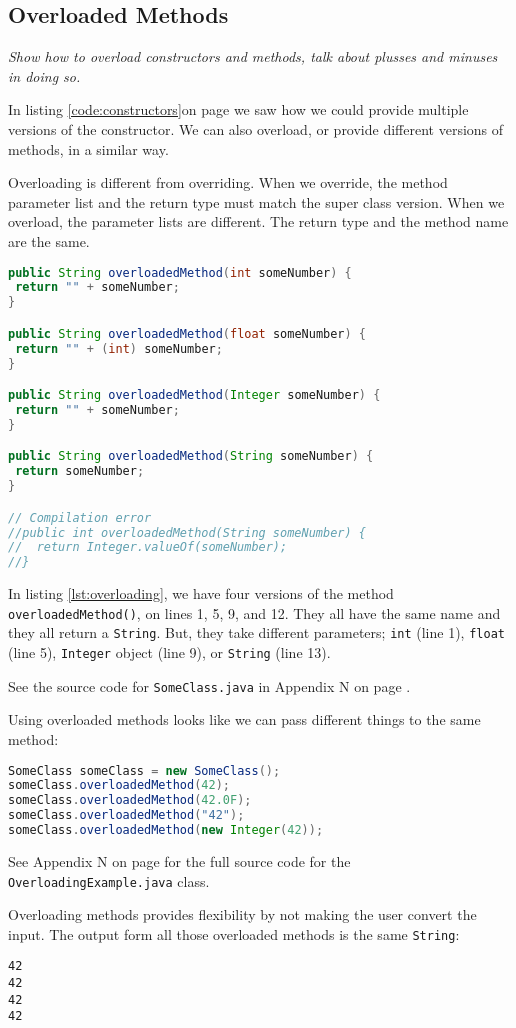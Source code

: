 \subsection{Overloaded Methods}
\textit{Show how to overload constructors and methods, talk about plusses and minuses in doing so.}

In listing \ref{code:constructors}on page \pageref{code:constructors} we saw how we could provide multiple versions of the constructor. We can also overload, or provide different versions of methods, in a similar way.

Overloading is different from overriding. When we override, the method parameter list and the return type must match the super class version. When we overload, the parameter lists are different. The return type and the method name are the same.

\begin{lstlisting}[language=Java, label=lst:overloading]
public String overloadedMethod(int someNumber) {
 return "" + someNumber;
}

public String overloadedMethod(float someNumber) {
 return "" + (int) someNumber;
}

public String overloadedMethod(Integer someNumber) {
 return "" + someNumber;
}

public String overloadedMethod(String someNumber) {
 return someNumber;
}

// Compilation error
//public int overloadedMethod(String someNumber) {
//  return Integer.valueOf(someNumber);
//}
\end{lstlisting}

In listing \ref{lst:overloading}, we have four versions of the method \texttt{overloadedMethod()}, on lines 1, 5, 9, and 12. They all have the same name and they all return a \texttt{String}. But, they take different parameters; \texttt{int} (line 1), \texttt{float} (line 5), \texttt{Integer} object (line 9), or \texttt{String} (line 13).

See the source code for \texttt{SomeClass.java} in Appendix N on page \pageref{App:AppendixN}.

Using overloaded methods looks like we can pass different things to the same method:
\begin{lstlisting}[language=Java]
SomeClass someClass = new SomeClass();
someClass.overloadedMethod(42);
someClass.overloadedMethod(42.0F);
someClass.overloadedMethod("42");
someClass.overloadedMethod(new Integer(42));
\end{lstlisting}

See Appendix N on page \pageref{App:AppendixN} for the full source code for the \texttt{OverloadingExample.java} class.

Overloading methods provides flexibility by not making the user convert the input. The output form all those overloaded methods is the same \texttt{String}:
\begin{lstlisting}
42
42
42
42
\end{lstlisting}